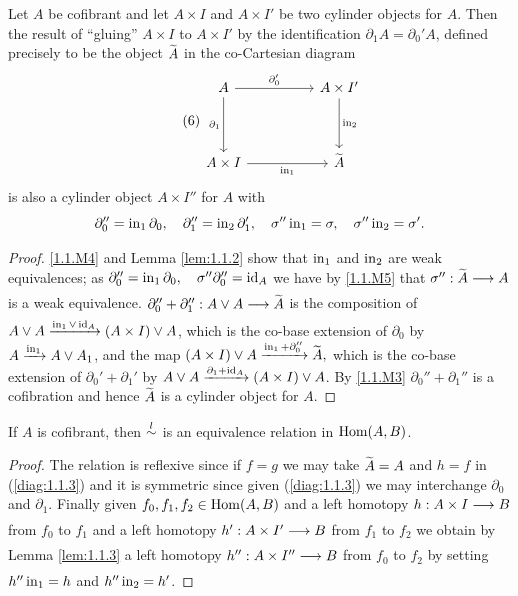 \documentclass[../main]{subfiles}
\begin{document}
\begin{lemma}\label{lem:1.1.3}
	Let $A$ be cofibrant and let $A\times I$ and $A\times I'$ be two cylinder objects for $A$. Then the result of ``gluing'' $A\times I$ to $A\times I'$ by the identification $\partial_1A=\partial_0'A$, defined precisely to be the object $\xtilde{A}$ in the co-Cartesian diagram
    \[\tag{6}\label{diag:1.1.6}\begin{tikzcd}
	A && {A\times I'} \\
	\\
	{A\times I} && {\xtilde{A}}
	\arrow["{\partial_1}"', from=1-1, to=3-1]
	\arrow["{\partial_0'}", from=1-1, to=1-3]
	\arrow["{\In_1}"', from=3-1, to=3-3]
	\arrow["{\In_2}", from=1-3, to=3-3]
    \end{tikzcd}\]
	is also a cylinder object $A\times I''$ for $A$ with \[\partial_0''=\operatorname{in}_1\partial_0, \quad \partial_1''=\operatorname{in}_2\partial_1', \quad \sigma'' \operatorname{in}_1 = \sigma,\quad \sigma''\operatorname{in}_2=\sigma'.\]
\end{lemma}

\begin{proof}
	\ref{1.1.M4} and Lemma \ref{lem:1.1.2} show that $\operatorname{in}_1$ and $\operatorname{in}_2$ are weak equivalences; as $\partial_0''=\operatorname{in}_1\partial_0,\quad \sigma''\partial_0''=\operatorname{id}_A$ we have by \ref{1.1.M5} that $\sigma'':\xtilde{A}\varrightarrow{}A$ is a weak equivalence. $\partial_0''+\partial_1'':A\vee A\varrightarrow{}\xtilde{A}$ is the composition of $A\vee A\varrightarrow{\In_1\vee \id_A}(A\times I)\vee A$, which is the co-base extension of $\partial_0$ by $A\varrightarrow{\In_1}A\vee A_1$, and the map $(A\times I)\vee A\varrightarrow{\In_1+\partial_0''} \xtilde{A},$ which is the co-base extension of $\partial_0'+\partial_1'$ by $A\vee A\varrightarrow{\partial_1+\id_A}(A\times I)\vee A$. By \ref{1.1.M3} $\partial_0''+\partial_1''$ is a cofibration and hence $\xtilde{A}$ is a cylinder object for $A$.
\end{proof}

\begin{lemma}\label{lem:1.1.4}
	If $A$ is cofibrant, then $\overset{l}{\sim}$ is an equivalence relation in $\operatorname{Hom}(A,B)$.
\end{lemma}

\begin{proof}
	The relation is reflexive since if $f=g$ we may take $\xtilde{A}=A$ and $h=f$ in (\ref{diag:1.1.3}) and it is symmetric since given (\ref{diag:1.1.3}) we may interchange $\partial_0$ and $\partial_1$. Finally given $f_0,f_1,f_2\in \operatorname{Hom}(A,B)$ and a left homotopy $h:A\times I\varrightarrow{} B$ from $f_0$ to $f_1$ and a left homotopy $h':A\times I'\varrightarrow{}B$ from $f_1$ to $f_2$ we obtain by Lemma \ref{lem:1.1.3} a left homotopy $h'':A\times I''\varrightarrow{} B$ from $f_0$ to $f_2$ by setting $h''\operatorname{in}_1=h$ and $h''\operatorname{in}_2 = h'$.
\end{proof}
\end{document}
